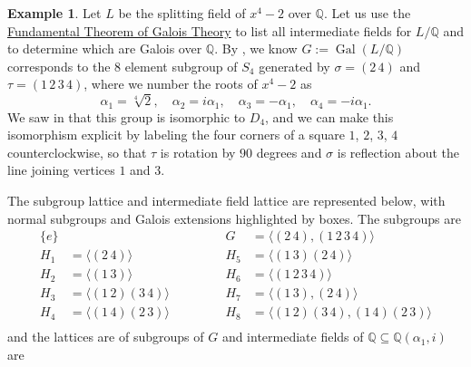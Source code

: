 \documentclass[12pt]{report}
\numberwithin{equation}{section}
\numberwithin{theorem}{chapter}
\theoremstyle{definition}
\newtheorem{example}[theorem]{Example}
\newtheorem*{basic properties}{Basic Properties}
\newtheorem*{Important Remark}{Important Remark}
\DeclareMathOperator{\Gal}{Gal}
\begin{document}
\begin{example}
Let $L$ be the splitting field of $x^4 - 2$ over $\mathbb{Q}$. Let us use the \hyperref[Fundamental Theorem of Galois Theory]{Fundamental Theorem of Galois Theory} to list all intermediate fields for $L/\mathbb{Q}$ and to determine which are Galois over $\mathbb{Q}$.
By , we know $G := \Gal(L/\mathbb{Q})$ corresponds to the $8$ element subgroup of $S_4$ generated by $\sigma = (2 \, 4)$ and $\tau = (1 \, 2 \,  3 \, 4)$, where we number the roots of $x^4-2$ as 
$$\alpha_1 = \sqrt[4]{2}, \quad \alpha_2 = i \alpha_1, \quad \alpha_3 = -\alpha_1, \quad \alpha_4 = -i \alpha_1.$$
We saw in  that this group is isomorphic to $D_4$, and we can make this isomorphism explicit by labeling the four corners of a square $1$, $2$, $3$, $4$ counterclockwise, so that $\tau$ is rotation by $90$ degrees and $\sigma$ is reflection about the line joining vertices $1$ and $3$.

The subgroup lattice and intermediate field lattice are represented below, with normal subgroups and Galois extensions highlighted by boxes.
The subgroups are
$$\begin{aligned}
\{e\} && \qquad &&  G &= \langle (2 \, 4), (1 \, 2 \, 3 \,4) \rangle \\
H_1 &= \langle (2 \, 4) \rangle & \qquad && H_5 &= \langle (1 \,3)(2 \, 4)  \rangle \\
H_2 &= \langle (1 \, 3)  \rangle & \qquad && H_6 & = \langle (1 \, 2 \, 3 \,4) \rangle \\
H_3 &= \langle (1 \, 2)(3 \, 4)  \rangle & \qquad && H_7 &= \langle  (1 \, 3), (2 \, 4)  \rangle \\
H_4 & = \langle (1 \,4)(2 \, 3)  \rangle & \qquad && H_8 &= \langle (1 \, 2)(3 \, 4), (1 \,4)(2 \, 3)  \rangle \\
\end{aligned}$$
and the lattices are of subgroups of $G$ and intermediate fields of $\mathbb{Q} \subseteq \mathbb{Q}(\alpha_1, i)$ are

\vspace{0.5em}


\end{example}
\end{document}

